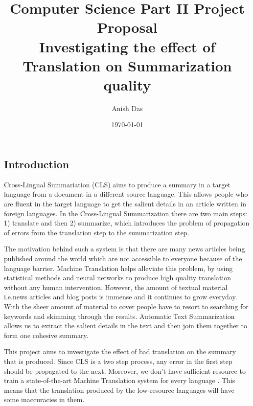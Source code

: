 \documentclass[12pt, a4paper]{article}
\title{ Computer Science Part II Project Proposal\\
Investigating the effect of Translation on Summarization quality}
\author{Anish Das}
\date{\today}
\begin{document}
% 



\subsection*{Introduction}
Cross-Lingual Summariation (CLS) aims to produce a summary in a target language from a document in a different source language. This allows people who are fluent in the target language to get the salient details in an article written in foreign languages. In the Cross-Lingual Summarization there are two main steps: 1) translate and then 2) summarize, which introduces the problem of propagation of errors from the translation step to the summarization step.

The motivation behind such a system is that there are many news articles being published around the world which are not accessible to everyone because of the language barrier. Machine Translation helps alleviate this problem, by using statistical methods and neural networks to produce high quality translation without any human intervention. 
However, the amount of textual material i.e.news articles and blog posts is immense and it continues to grow everyday. With the sheer amount of material to cover people have to resort to searching for keywords and skimming through the results. Automatic Text Summarization allows us to extract the salient details in the text and then join them together to form one cohesive summary. 

This project aims to investigate the effect of bad translation on the summary that is produced. Since CLS is a two step process, any error in the first step should be propagated to the next. Moreover, we don't have sufficient resource to train a state-of-the-art Machine Translation system for every language . This means that the translation produced by the low-resource languages will have some inaccuracies in them.
\end{document}
